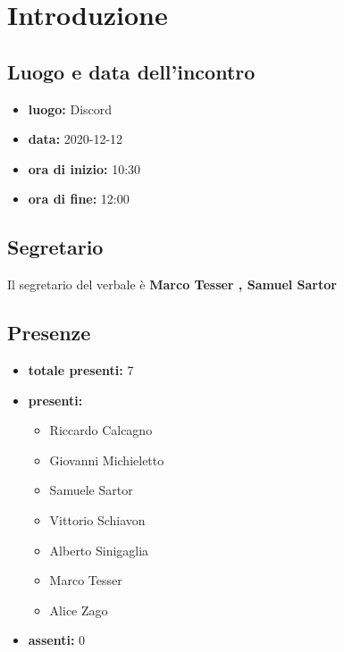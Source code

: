\section{Introduzione}

\subsection{Luogo e data dell'incontro}
	\begin{itemize}
		\item \textbf{luogo:} Discord
		\item \textbf{data:} 2020-12-12
		\item \textbf{ora di inizio:} 10:30
		\item \textbf{ora di fine:} 12:00
	\end{itemize}

\subsection{Segretario}
Il segretario del verbale è \textbf{Marco Tesser , Samuel Sartor}

\subsection{Presenze}
	\begin{itemize}
		\item \textbf{totale presenti:} 7
		\item \textbf{presenti: }
			\begin{itemize}		
				\item Riccardo Calcagno
				\item Giovanni Michieletto
				\item Samuele Sartor
				\item Vittorio Schiavon
				\item Alberto Sinigaglia
				\item Marco Tesser
				\item Alice Zago
			\end{itemize}
		\item \textbf{assenti: } 0
	\end{itemize}


\newpage
